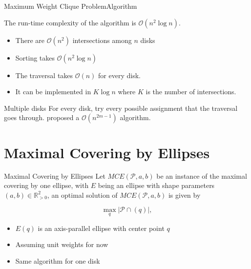 \documentclass{beamer}
\newcommand{\R}{\mathbb{R}}
\newcommand{\Pp}{\mathscr{P}}
\newcommand{\bigO}{\mathscr{O}}
\begin{document}
\begin{frame}{Maximum Weight Clique Problem}{Algorithm}
	
	The run-time complexity of the algorithm is $\bigO(n^2\log{n})$.
	
	\begin{itemize}
		\item There are $\bigO(n^2)$ intersections among $n$ disks
		
		\item Sorting takes $\bigO(n^2\log{n})$
		
		\item The traversal takes $\bigO(n)$ for every disk.
		
		\item It can be implemented in $K\log{n}$ where $K$ is the number of intersections.
	\end{itemize}

\begin{block}{Multiple disks}
	For every disk, try every possible assignment that the traversal goes through. \cite{cabello:2006} proposed a $\bigO(n^{2m-1})$ algorithm.
\end{block}
	

	
	
\end{frame}

\section{Maximal Covering by Ellipses}

\begin{frame}{Maximal Covering by Ellipses}
	Let $MCE(\Pp, a, b)$ be an instance of the maximal covering by one ellipse, with $E$ being an ellipse with shape parameters $(a,b) \in \R_{>0}^2$, an optimal solution of $MCE(\Pp, a, b)$ is given by
	
	\begin{equation*}
	\max_q |\Pp \cap (q)|,
	\end{equation*}

	\begin{itemize}
		\item $E(q)$ is an axis-parallel ellipse with center point $q$
		\item Assuming unit weights for now
		\item Same algorithm for one disk
	\end{itemize}

\end{frame}
\end{document}
